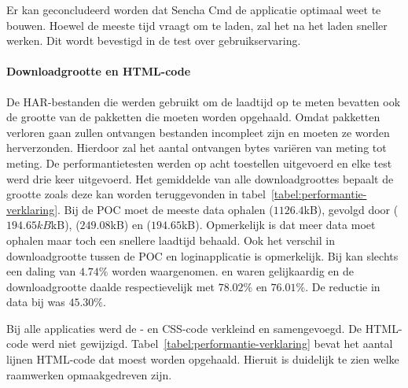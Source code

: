 Er kan geconcludeerd worden dat Sencha Cmd de applicatie optimaal weet te bouwen.
Hoewel \st{} de meeste tijd vraagt om te laden, zal het na het laden sneller werken.
Dit wordt bevestigd in de test over gebruikservaring.

\paragraph{Downloadgrootte en HTML-code}
De HAR-bestanden die werden gebruikt om de laadtijd op te meten bevatten ook de grootte van de pakketten die moeten worden opgehaald.
Omdat pakketten verloren gaan zullen ontvangen bestanden incompleet zijn en moeten ze worden herverzonden. %
Hierdoor zal het aantal ontvangen bytes variëren van meting tot meting.
De performantietesten werden op acht toestellen uitgevoerd en elke test werd drie keer uitgevoerd.
Het gemiddelde van alle downloadgroottes bepaalt de grootte zoals deze kan worden teruggevonden in tabel~\ref{tabel:performantie-verklaring}.
Bij de POC moet \st{} de meeste data ophalen ($1126.4$kB),  gevolgd door \kendo{} ($194.65kB$kB), \lungo{} ($249.08$kB) en \jqm{} ($194.65$kB).
Opmerkelijk is dat \lungo{} meer data moet ophalen maar toch een snellere laadtijd behaald.
Ook het verschil in downloadgrootte tussen de POC en loginapplicatie is opmerkelijk.
Bij \jqm{} kan slechts een daling van $4.74\%$ worden waargenomen.
\st{} en \lungo{} waren gelijkaardig en de downloadgrootte daalde respectievelijk met $78.02\%$ en $76.01\%$.
De reductie in data bij \kendo{} was $45.30\%$.

Bij alle applicaties werd de \js{}- en CSS-code verkleind en samengevoegd.
De HTML-code werd niet gewijzigd.
Tabel~\ref{tabel:performantie-verklaring} bevat het aantal lijnen HTML-code dat moest worden opgehaald.
Hieruit is duidelijk te zien welke raamwerken opmaakgedreven zijn.

